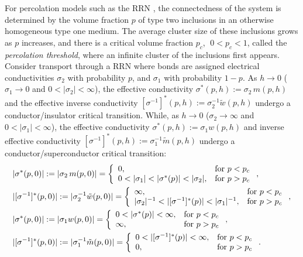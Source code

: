 \documentclass[english,12pt]{ttuthes}
\begin{document}
For percolation models such as the RRN
\cite{Stauffer-92,Torquato:RHM-02}, the connectedness of the system is
determined by the volume fraction $p$ of type two inclusions in an
otherwise homogeneous type one medium. The average cluster size of
these  inclusions grows as $p$ increases, and there is a critical
volume fraction $p_c$, $\;0<p_c<1$, called the \emph{percolation
  threshold}, where an infinite cluster of the inclusions first 
appears. Consider transport through a RRN \cite{Golden:PRL-3935} where 
bonds are assigned electrical conductivities $\sigma_2$ with probability
$p$, and $\sigma_1$ with probability $1-p$. As $h\to0$ ($\sigma_1\to0$ and
$0<|\sigma_2|<\infty$), the effective conductivity $\sigma^*(p,h):=\sigma_2\,m(p,h)$ and the
effective inverse conductivity
$[\sigma^{-1}]^*(p,h):=\sigma_2^{-1}\tilde{w}(p,h)$ undergo a
conductor/insulator critical transition. While, as $h\to0$ ($\sigma_2\to\infty$ and
$0<|\sigma_1|<\infty$), the effective conductivity $\sigma^*(p,h):=\sigma_1w(p,h)$ and
inverse effective conductivity
$[\sigma^{-1}]^*(p,h):=\sigma_1^{-1}\tilde{m}(p,h)$ undergo a 
conductor/superconductor critical transition:      
%
\begin{align}\label{eq:Cond-Insul_Crit_Beh_pc}
  &|\sigma^*(p,0)|:=|\sigma_2\,m(p,0)|=\left\{
    \begin{array}{ll}
      0, &       \text{for } p<p_c\\
      0<|\sigma_1|<|\sigma^*(p)|<|\sigma_2|, & \text{for } p>p_c
    \end{array}
    \right. ,
\\
  &|[\sigma^{-1}]^*(p,0)|:=|\sigma_2^{-1}\tilde{w}(p,0)|=\left\{
    \begin{array}{ll}
      \infty, &       \text{for } p<p_c\\
     |\sigma_2|^{-1}<|[\sigma^{-1}]^*(p)|<|\sigma_1|^{-1}, & \text{for } p>p_c
    \end{array}
    \right. ,\notag\\
\label{eq:Cond-SuperCond_Crit_Beh_pc}
  &|\sigma^*(p,0)|:=|\sigma_1w(p,0)|=\left\{
    \begin{array}{ll}
      0<|\sigma^*(p)|<\infty, &       \text{for } p<p_c\\
      \infty, & \text{for } p>p_c
    \end{array}
    \right. ,
\\
  &|[\sigma^{-1}]^*(p,0)|:=|\sigma_1^{-1}\tilde{m}(p,0)|=\left\{
    \begin{array}{ll}
      0<|[\sigma^{-1}]^*(p)|<\infty, &       \text{for } p<p_c\\
      0, & \text{for } p>p_c
    \end{array}
    \right. .\notag
  \end{align}
%
\end{document}
